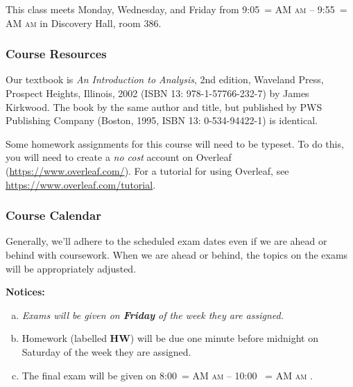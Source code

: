 \documentclass[12pt]{article}
\makeatletter
\newcounter{ex}\setcounter{ex}{0}
\newenvironment{alphalist}{
  \begin{enumerate}[(a)]
    \addtolength{\itemsep}{-0.5\itemsep}}
  {\end{enumerate}}
\DeclareRobustCommand{\maybefakesc}[1]{%
  \ifnum\pdfstrcmp{\f@series}{\bfdefault}=\z@
    {\fontsize{\dimexpr0.8\dimexpr\f@size pt\relax}{0}\selectfont\uppercase{#1}}%
  \else
    \textsc{#1}%
  \fi
}
\newcommand\AM{\,\maybefakesc{am}\xspace}
\newcommand{\room}{Discovery Hall, room  386}
\newcommand{\meetingtime}{This class meets Monday, Wednesday, and Friday  from 
	9:05\AM -- 9:55\AM}
\newcommand{\finaldateandtime}{\printdate{14/12/\the\year} 8:00\AM{} -- 10:00 \AM}
\makeatother
\begin{document}
\meetingtime in \room.

\subsubsection*{Course Resources}

Our textbook is \emph{An Introduction to Analysis}, 2nd edition, Waveland Press, Prospect Heights, Illinois, 2002 (ISBN 13: 978-1-57766-232-7) by James Kirkwood. The book by the same author and title, but published by PWS Publishing Company (Boston, 1995, ISBN 13:
0-534-94422-1) is identical.

 Some homework assignments for this course will need to be typeset. To do this, you will need to create a \emph{no cost} 
account on Overleaf (\url{https://www.overleaf.com/}).   For a  tutorial for using Overleaf, see \url{https://www.overleaf.com/tutorial}.



\subsubsection*{Course Calendar}

Generally, we'll adhere to the scheduled exam dates even if we are ahead or behind with coursework.  
When we are ahead or behind, the topics on the exams will be appropriately adjusted.  


\vspace{0.1in}
\noindent \textbf{Notices:}


\begin{alphalist}
   \item \emph{Exams will be given on  \textbf{Friday} of the week they are assigned.}
   

    \item Homework (labelled \textbf{HW}) will be due one minute before midnight on  Saturday of the week they are assigned.  

    \item The final exam will be given on \finaldateandtime.
    
\end{alphalist}

\vspace{0.1in}
\end{document}
